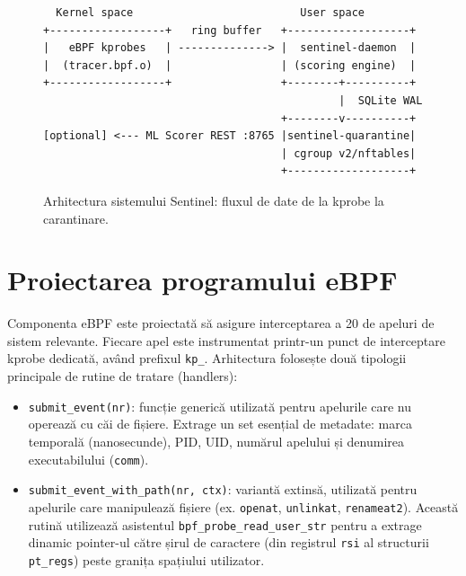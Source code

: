 \begin{figure}[htbp]
\centering
\begin{verbatim}
  Kernel space                          User space
+------------------+   ring buffer   +-------------------+
|   eBPF kprobes   | --------------> |  sentinel-daemon  |
|  (tracer.bpf.o)  |                 | (scoring engine)  |
+------------------+                 +--------+----------+
                                              |  SQLite WAL
                                     +--------v----------+
[optional] <--- ML Scorer REST :8765 |sentinel-quarantine|
                                     | cgroup v2/nftables|
                                     +-------------------+
\end{verbatim}
\caption{Arhitectura sistemului Sentinel: fluxul de date de la kprobe la carantinare.}
\label{fig:architecture}
\end{figure}

\section{Proiectarea programului eBPF}
\label{sec:ebpf_design}

\par Componenta eBPF este proiectată să asigure interceptarea a 20 de apeluri de sistem relevante. Fiecare apel este instrumentat printr-un punct de interceptare kprobe dedicată, având prefixul \texttt{kp\_}. Arhitectura folosește două tipologii principale de rutine de tratare (handlers):

\begin{itemize}
    \item \texttt{submit\_event(nr)}: funcție generică utilizată pentru apelurile care nu operează cu căi de fișiere. Extrage un set esențial de metadate: marca temporală (nanosecunde), PID, UID, numărul apelului și denumirea executabilului (\texttt{comm}).
    \item \texttt{submit\_event\_with\_path(nr, ctx)}: variantă extinsă, utilizată pentru apelurile care manipulează fișiere (ex. \texttt{openat}, \texttt{unlinkat}, \texttt{renameat2}). Această rutină utilizează asistentul \texttt{bpf\_probe\_read\_user\_str} pentru a extrage dinamic pointer-ul către șirul de caractere (din registrul \texttt{rsi} al structurii \texttt{pt\_regs}) peste granița spațiului utilizator.
\end{itemize}


